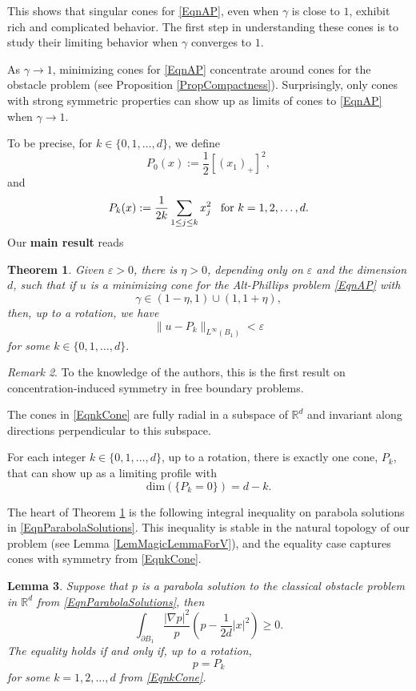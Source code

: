 \documentclass{amsart}
\def\R {\mathbb{R}}
\def\eps{\varepsilon}
\def\hem{\hspace{0.5em}}
\def\vem{\vspace{0.6em}}
\newtheorem{thm}{Theorem}[section]
\newtheorem{lem}[thm]{Lemma}
\theoremstyle{definition}
\numberwithin{equation}{section}
\theoremstyle{remark}
\newtheorem{rem}[thm]{Remark}
\begin{document}
This shows that singular cones  for \eqref{EqnAP}, even when $\gamma$ is close to $1$, exhibit rich and complicated behavior. The first step in understanding these cones is to study their limiting behavior when $\gamma$ converges to $1$.

\vem

As $\gamma\to 1$, minimizing cones for \eqref{EqnAP} concentrate around cones for the obstacle problem (see Proposition \ref{PropCompactness}). Surprisingly, only cones with strong symmetric properties can show up as limits of cones to \eqref{EqnAP} when $\gamma\to1. $ 

To be precise, for  $k\in\{0,1,\dots,d\}$, we define 
\begin{equation}
\label{Eqn0Cone}
P_0(x):=\frac12[(x_1)_+]^2,
\end{equation} 
and
\begin{equation}
\label{EqnkCone}
P_k(x):=\frac{1}{2k}\sum_{1\le j\le k}x_j^2 \hem\text{ for }k=1,2,\dots,d.
\end{equation} 
Our \textbf{main result} reads
\begin{thm}
\label{ThmMain}
Given $\eps>0$, there is $\eta>0$, depending only on $\eps$ and the dimension $d$, such that if $u$ is a minimizing cone for the Alt-Phillips problem \eqref{EqnAP} with
$$
\gamma\in(1-\eta,1)\cup(1,1+\eta),
$$
then, up to a rotation, we have
$$
\|u-P_k\|_{L^\infty(B_1)}<\eps 
$$
 for some $k\in\{0,1,\dots,d\}.$
\end{thm} 

\begin{rem}
To the knowledge of the authors, this is the first result on concentration-induced symmetry in free boundary problems. 

The cones in \eqref{EqnkCone} are fully radial in a subspace of $\R^d$ and invariant along directions perpendicular to this subspace. 

For each integer $k\in\{0,1,\dots,d\}$, up to a rotation,  there is exactly one cone, $P_k$, that can show up as a limiting profile with $$\mathrm{dim}(\{P_k=0\})=d-k.$$
\end{rem}
\vem
The heart of  Theorem \ref{ThmMain} is the following integral inequality on parabola solutions in \eqref{EqnParabolaSolutions}. This inequality is stable in the natural topology of our problem (see Lemma \ref{LemMagicLemmaForV}), and the equality case captures cones with symmetry from \eqref{EqnkCone}.
\begin{lem}
\label{LemMagicLemma}
Suppose that $p$ is a parabola solution to the classical obstacle problem in $\R^d$ from \eqref{EqnParabolaSolutions}, then
\begin{equation*}
\int_{\partial B_1}\frac{|\nabla p|^2}{p}(p-\frac{1}{2d}|x|^2)\ge0.
\end{equation*} 
The equality  holds if and only if, up to a rotation, 
$$
p=P_k
$$
 for some $k=1,2,\dots,d$ from \eqref{EqnkCone}.
\end{lem} 
\end{document}
